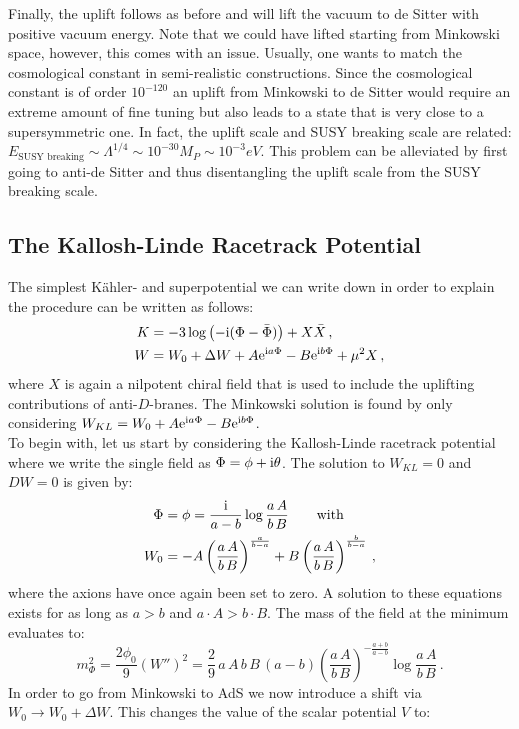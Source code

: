 \documentclass[a4paper,12pt]{report}
\newcommand{\be}{\begin{equation}}
\newcommand{\ee}{\end{equation}}
\newcommand{\bea}{\begin{equation}\begin{aligned}}
\newcommand{\eea}{\end{aligned}\end{equation}}
\def\rmi{{\rm i}}
\def\rme{{\rm e}}
\begin{document}
Finally, the uplift follows as before and will lift the vacuum to de Sitter with positive vacuum energy. Note that we could have lifted starting from Minkowski space, however, this comes with an issue. Usually, one wants to match the cosmological constant in semi-realistic constructions. Since the cosmological constant is of order $10^{-120}$ an uplift from Minkowski to de Sitter would require an extreme amount of fine tuning but also leads to a state that is very close to a supersymmetric one. In fact, the uplift scale and SUSY breaking scale are related: $E_{\text{SUSY breaking}} \sim \Lambda^ {1/4} \sim 10^ {-30} M_P \sim 10^ {-3} eV$. This problem can be alleviated by first going to anti-de Sitter and thus disentangling the uplift scale from the SUSY breaking scale. 

\subsection{The Kallosh-Linde Racetrack Potential}
\label{sec:KLmodel}
The simplest Kähler- and superpotential we can write down in order to explain the procedure can be written as follows:
\bea 
K &=-3\log \left(-\rmi (\Phi - \bar{\Phi})\right) + X \bar{X}\,,\\
W &=W_0 + \Delta W +  A \rme^{\rmi a \Phi} - B \rme^{\rmi b \Phi} + \mu^2 X\,,
\label{eq:KLWandK}
\eea 
where $X$ is again a nilpotent chiral field that is used to include the uplifting contributions of anti-$D$-branes. The Minkowski solution is found by only considering $W_{KL} = W_0 +  A \rme^{\rmi a \Phi} - B \rme^{\rmi b \Phi}$.\\
To begin with, let us start by considering the Kallosh-Linde racetrack potential where we write the single field as $\Phi = \phi + \rmi \theta$. The solution to $W_{KL} = 0$ and $DW=0$ is given by:
\bea
\Phi &= \phi = \frac{\rmi}{a-b} \log \frac{a\, A}{b\, B} \qquad \text{with}\\
W_0 &= -A\left(\frac{a\, A}{b\, B}\right)^{\frac{a}{b-a}} + B\left(\frac{a\, A}{b\, B}\right)^{\frac{b}{b-a}}\,,
\eea
where the axions have once again been set to zero. A solution to these equations exists for as long as $a>b$ and $a\cdot A > b\cdot B$. The mass of the field at the minimum evaluates to:
\be 
m_\Phi^2 = \frac{2\phi_0}{9} \left( W'' \right)^2 = \frac{2}{9}\, a\,A\,b\,B\,(a-b) \left( \frac{a\,A}{b\,B}\right)^{-\frac{a+b}{a-b}} \log \frac{a\, A}{b\,B}\,.
\ee
In order to go from Minkowski to AdS we now introduce a shift via $W_0 \to W_0 + \Delta W$. This changes the value of the scalar potential $V$ to:
\end{document}
